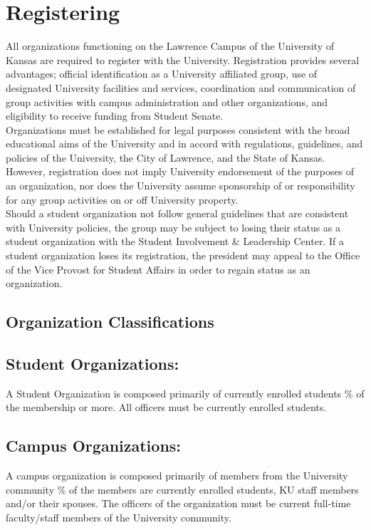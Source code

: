 \section{Registering}
\label{sec:sec02}

All organizations functioning on the Lawrence Campus of the University of Kansas are required to register with the University. Registration provides several advantages; official identification as a University affiliated group, use of designated University facilities and services, coordination and communication of group activities with campus administration and other organizations, and eligibility to receive funding from Student Senate.
\\
Organizations must be established for legal purposes consistent with the broad educational aims of the University and in accord with regulations, guidelines, and policies of the University, the City of Lawrence, and the State of Kansas. However, registration does not imply University endorsement of the purposes of an organization, nor does the University assume sponsorship of or responsibility for any group activities on or off University property.
\\
Should a student organization not follow general guidelines that are consistent with University policies, the group may be subject to losing their status as a student organization with the Student Involvement \& Leadership Center. If a student organization loses its registration, the president may appeal to the Office of the Vice Provost for Student Affairs in order to regain status as an organization.

\subsection{Organization Classifications}

\subsection*{Student Organizations:} A Student Organization is composed primarily of currently enrolled students \% of the membership or more. All officers must be currently enrolled students.
\subsection*{Campus Organizations:} A campus organization is composed primarily of members from the University community \% of the members are currently enrolled students, KU staff members and/or their spouses. The officers of the organization must be current full-time faculty/staff members of the University community.

